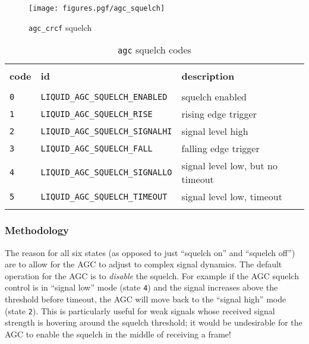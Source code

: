 \begin{figure}
\centering
  \texttt{[image: figures.pgf/agc\_squelch]}
\caption{{\tt agc\_crcf} squelch}
\label{fig:module:agc:squelch}
\end{figure}


\begin{table}[!ht]
\caption{{\tt agc} squelch codes}
\label{tab:module:agc:squelch_codes}
\centering
\begin{tabular*}{0.95\textwidth}{@{\extracolsep{\fill}}lll}

\hline\hline \\[-6pt]
{\bf code} & {\bf id} & {\bf description} \\[6pt]
\hline \\[-6pt]
{\tt 0} & {\tt LIQUID\_AGC\_SQUELCH\_ENABLED}    & squelch enabled \\
{\tt 1} & {\tt LIQUID\_AGC\_SQUELCH\_RISE}       & rising edge trigger \\
{\tt 2} & {\tt LIQUID\_AGC\_SQUELCH\_SIGNALHI}   & signal level high \\
{\tt 3} & {\tt LIQUID\_AGC\_SQUELCH\_FALL}       & falling edge trigger \\
{\tt 4} & {\tt LIQUID\_AGC\_SQUELCH\_SIGNALLO}   & signal level low, but no timeout \\
{\tt 5} & {\tt LIQUID\_AGC\_SQUELCH\_TIMEOUT}    & signal level low, timeout \\ \\[-6pt]

\hline\hline
\end{tabular*}
\end{table}%


\subsubsection{Methodology}
\label{module:agc:squelch:methodology}
The reason for all six states (as opposed to just ``squelch on'' and ``squelch
off'') are to allow for the AGC to adjust to complex signal dynamics.
The default operation for the AGC is to {\it disable} the squelch.
For example if the AGC squelch control is in ``signal low'' mode
(state {\tt 4}) and the signal increases above the threshold before timeout,
the AGC will move back to the ``signal high'' mode (state {\tt 2}).
This is particularly useful for weak signals whose received signal strength is
hovering around the squelch threshold; it would be undesirable for the AGC to
enable the squelch in the middle of receiving a frame!

